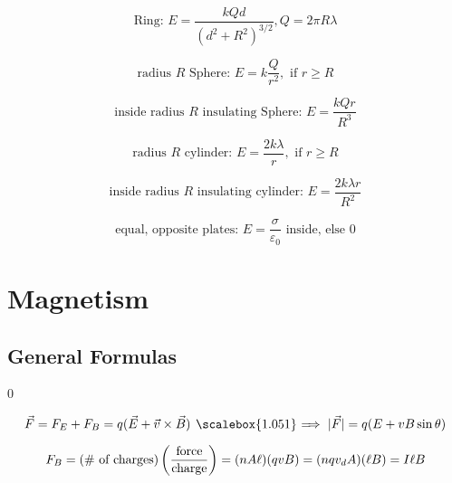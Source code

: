 \documentclass[12pt]{article}
\newcommand \hpx [1]{\hspace{#1px}}
\newcommand \nhpx [1]{\hspace{-#1px}}
\renewcommand \implies {\ensuremath{\hpx 4 \raisebox{-0.14px}{\scalebox{1.051} =} \nhpx{5.2} \Rightarrow \hpx 3}}
\newcommand \eps \varepsilon
\begin{document}
\begin{equation}
	\text{Ring: } E = \dfrac{k Q d}{\left(d^2 + R^2\right)^{3/2}}, Q = 2 \pi R \lambda
\end{equation}

\begin{equation}
	\text{radius $R$ Sphere: } E = k \dfrac Q {r^2}, \text{ if } r \ge R
\end{equation}

\begin{equation}
	\text{inside radius $R$ insulating Sphere: } E = \dfrac {k Q r} {R^3}
\end{equation}

\begin{equation}
	\text{radius $R$ cylinder: } E = \dfrac {2 k \lambda} r, \text{ if } r \ge R
\end{equation}

\begin{equation}
	\text{inside radius $R$ insulating cylinder: } E = \dfrac {2 k \lambda r} {R^2}
\end{equation}

\begin{equation}
	\text{equal, opposite plates: } E = \dfrac \sigma {\eps_0} \text{ inside, else } 0
\end{equation}

\newpage

\section{Magnetism}

\subsection{General Formulas} \setcounter {equation} 0

\begin{equation}
	\vec F = F_E + F_B = q (\vec E + \vec v \times \vec B) \implies |\vec F| = q (E + v B \sin \theta)
\end{equation}

\noindent {}

\begin{equation}
	F_B = (\text{\# of charges}) \left(\dfrac{\rm force}{\rm charge}\right)
		= (n A \ell)(q v B)
		= (n q v_d A) (\ell B)
		= I \ell B
\end{equation}
\end{document}
